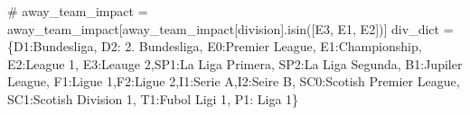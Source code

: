 \documentclass[
  letterpaper,
  DIV=11,
  numbers=noendperiod]{scrartcl}
\newenvironment{Shaded}{\begin{snugshade}}{\end{snugshade}}
\newcommand{\CommentTok}[1]{\textcolor[rgb]{0.37,0.37,0.37}{#1}}
\newcommand{\NormalTok}[1]{\textcolor[rgb]{0.00,0.23,0.31}{#1}}
\newcommand{\OperatorTok}[1]{\textcolor[rgb]{0.37,0.37,0.37}{#1}}
\newcommand{\StringTok}[1]{\textcolor[rgb]{0.13,0.47,0.30}{#1}}
\begin{document}
\begin{Shaded}
\begin{Highlighting}[]
\CommentTok{\# away\_team\_impact = away\_team\_impact[away\_team\_impact[\textquotesingle{}division\textquotesingle{}].isin([\textquotesingle{}E3\textquotesingle{}, \textquotesingle{}E1\textquotesingle{}, \textquotesingle{}E2\textquotesingle{}])]}
\NormalTok{div\_dict }\OperatorTok{=}\NormalTok{ \{}\StringTok{\textquotesingle{}D1\textquotesingle{}}\NormalTok{:}\StringTok{\textquotesingle{}Bundesliga\textquotesingle{}}\NormalTok{, }\StringTok{\textquotesingle{}D2\textquotesingle{}}\NormalTok{: }\StringTok{\textquotesingle{}2. Bundesliga\textquotesingle{}}\NormalTok{, }\StringTok{\textquotesingle{}E0\textquotesingle{}}\NormalTok{:}\StringTok{\textquotesingle{}Premier League\textquotesingle{}}\NormalTok{, }\StringTok{\textquotesingle{}E1\textquotesingle{}}\NormalTok{:}\StringTok{\textquotesingle{}Championship\textquotesingle{}}\NormalTok{, }
            \StringTok{\textquotesingle{}E2\textquotesingle{}}\NormalTok{:}\StringTok{\textquotesingle{}League 1\textquotesingle{}}\NormalTok{, }\StringTok{\textquotesingle{}E3\textquotesingle{}}\NormalTok{:}\StringTok{\textquotesingle{}Leauge 2\textquotesingle{}}\NormalTok{,}\StringTok{\textquotesingle{}SP1\textquotesingle{}}\NormalTok{:}\StringTok{\textquotesingle{}La Liga Primera\textquotesingle{}}\NormalTok{, }\StringTok{\textquotesingle{}SP2\textquotesingle{}}\NormalTok{:}\StringTok{\textquotesingle{}La Liga Segunda\textquotesingle{}}\NormalTok{,}
              \StringTok{\textquotesingle{}B1\textquotesingle{}}\NormalTok{:}\StringTok{\textquotesingle{}Jupiler League\textquotesingle{}}\NormalTok{, }\StringTok{\textquotesingle{}F1\textquotesingle{}}\NormalTok{:}\StringTok{\textquotesingle{}Ligue 1\textquotesingle{}}\NormalTok{,}\StringTok{\textquotesingle{}F2\textquotesingle{}}\NormalTok{:}\StringTok{\textquotesingle{}Ligue 2\textquotesingle{}}\NormalTok{,}\StringTok{\textquotesingle{}I1\textquotesingle{}}\NormalTok{:}\StringTok{\textquotesingle{}Serie A\textquotesingle{}}\NormalTok{,}\StringTok{\textquotesingle{}I2\textquotesingle{}}\NormalTok{:}\StringTok{\textquotesingle{}Seire B\textquotesingle{}}\NormalTok{, }
              \StringTok{\textquotesingle{}SC0\textquotesingle{}}\NormalTok{:}\StringTok{\textquotesingle{}Scotish Premier League\textquotesingle{}}\NormalTok{, }\StringTok{\textquotesingle{}SC1\textquotesingle{}}\NormalTok{:}\StringTok{\textquotesingle{}Scotish Division 1\textquotesingle{}}\NormalTok{, }\StringTok{\textquotesingle{}T1\textquotesingle{}}\NormalTok{:}\StringTok{\textquotesingle{}Fubol Ligi 1\textquotesingle{}}\NormalTok{, }\StringTok{\textquotesingle{}P1\textquotesingle{}}\NormalTok{: }\StringTok{\textquotesingle{}Liga 1\textquotesingle{}}\NormalTok{\}}

\end{Highlighting}
\end{Shaded}
\end{document}
